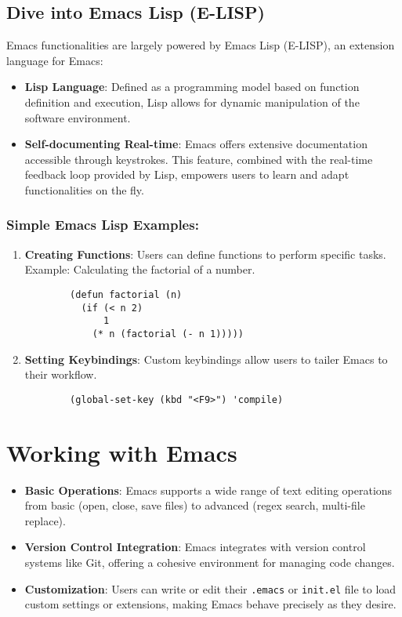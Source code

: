 \documentclass{article}
\begin{document}
\subsection{Dive into Emacs Lisp (E-LISP)}

Emacs functionalities are largely powered by Emacs Lisp (E-LISP), an extension language for Emacs:

\begin{itemize}
    \item \textbf{Lisp Language}: Defined as a programming model based on function definition and execution, Lisp allows for dynamic manipulation of the software environment.
    \item \textbf{Self-documenting Real-time}: Emacs offers extensive documentation accessible through keystrokes. This feature, combined with the real-time feedback loop provided by Lisp, empowers users to learn and adapt functionalities on the fly.
\end{itemize}

\subsubsection{Simple Emacs Lisp Examples:}

\begin{enumerate}
    \item \textbf{Creating Functions}: Users can define functions to perform specific tasks. Example: Calculating the factorial of a number.

    \begin{verbatim}
        (defun factorial (n)
          (if (< n 2)
              1
            (* n (factorial (- n 1)))))
    \end{verbatim}

    \item \textbf{Setting Keybindings}: Custom keybindings allow users to tailer Emacs to their workflow.

    \begin{verbatim}
        (global-set-key (kbd "<F9>") 'compile)
    \end{verbatim}
\end{enumerate}

\section{Working with Emacs}

\begin{itemize}
    \item \textbf{Basic Operations}: Emacs supports a wide range of text editing operations from basic (open, close, save files) to advanced (regex search, multi-file replace).
    \item \textbf{Version Control Integration}: Emacs integrates with version control systems like Git, offering a cohesive environment for managing code changes.
    \item \textbf{Customization}: Users can write or edit their \texttt{.emacs} or \texttt{init.el} file to load custom settings or extensions, making Emacs behave precisely as they desire.
\end{itemize}
\end{document}
